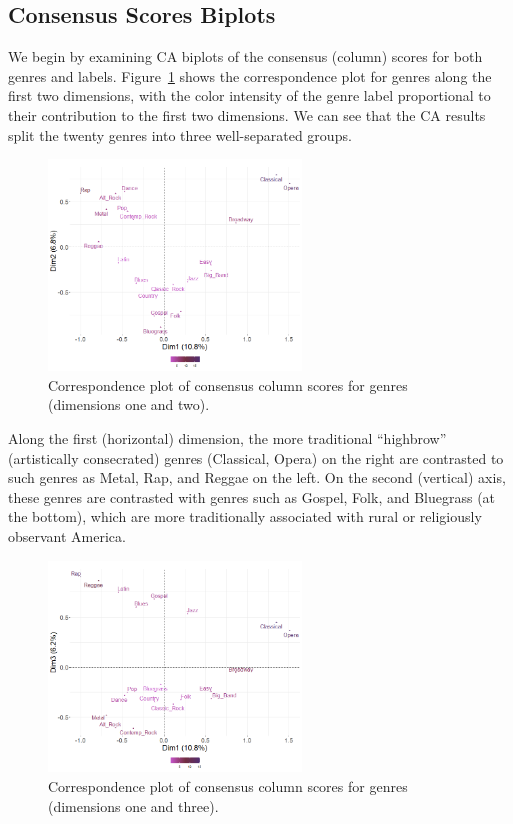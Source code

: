 \documentclass[12pt]{article}
\begin{document}
\subsection*{Consensus Scores Biplots}
We begin by examining CA biplots of the consensus (column) scores for both genres and labels. Figure~\ref{fig:ca-genre-biplot12} shows the correspondence plot for genres along the first two dimensions, with the color intensity of the genre label proportional to their contribution to the first two dimensions. We can see that the CA results split the twenty genres into three well-separated groups. 

\begin{figure}[t]
    \captionsetup[subfigure]{font=footnotesize,labelfont=footnotesize}
    \centering
        \includegraphics[trim={0cm 0cm 0cm 0cm},clip, width=0.6\textwidth]{Plots/ca-genre-col12.png}
    \caption{Correspondence plot of consensus column scores for genres (dimensions one and two).}
    \label{fig:ca-genre-biplot12}
\end{figure}

Along the first (horizontal) dimension, the more traditional ``highbrow'' (artistically consecrated) genres (Classical, Opera) on the right are contrasted to such genres as Metal, Rap, and Reggae on the left. On the second (vertical) axis, these genres are contrasted with genres such as Gospel, Folk, and Bluegrass (at the bottom), which are more traditionally associated with rural or religiously observant America. 

\begin{figure}[t]
    \captionsetup[subfigure]{font=footnotesize,labelfont=footnotesize}
    \centering
        \includegraphics[trim={0cm 0cm 0cm 0cm},clip, width=0.6\textwidth]{Plots/ca-genre-col13.png}
    \caption{Correspondence plot of consensus column scores for genres (dimensions one and three).}
    \label{fig:ca-genre-biplot13}
\end{figure}
\end{document}

